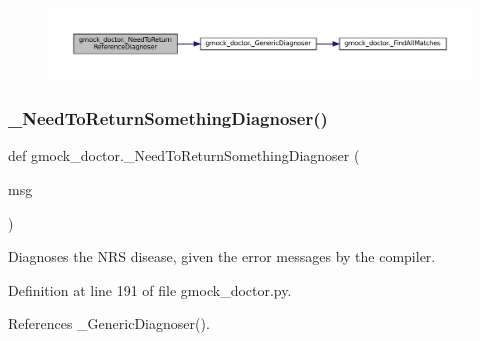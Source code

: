 \nopagebreak
\begin{figure}[H]
\begin{center}
\leavevmode
\includegraphics[width=350pt]{namespacegmock__doctor_aa922367471c9e517f839f98e0e3b0a1c_cgraph}
\end{center}
\end{figure}
\mbox{\label{namespacegmock__doctor_a1dc705b817ae15dbf51ebce10e47ed3f}} 
\subsubsection{\texorpdfstring{\+\_\+\+Need\+To\+Return\+Something\+Diagnoser()}{\_NeedToReturnSomethingDiagnoser()}}
{\footnotesize\ttfamily def gmock\+\_\+doctor.\+\_\+\+Need\+To\+Return\+Something\+Diagnoser (\begin{DoxyParamCaption}\item[{}]{msg }\end{DoxyParamCaption})\hspace{0.3cm}{\ttfamily [private]}}

\begin{DoxyVerb}Diagnoses the NRS disease, given the error messages by the compiler.\end{DoxyVerb}
 

Definition at line 191 of file gmock\+\_\+doctor.\+py.



References \+\_\+\+Generic\+Diagnoser().


